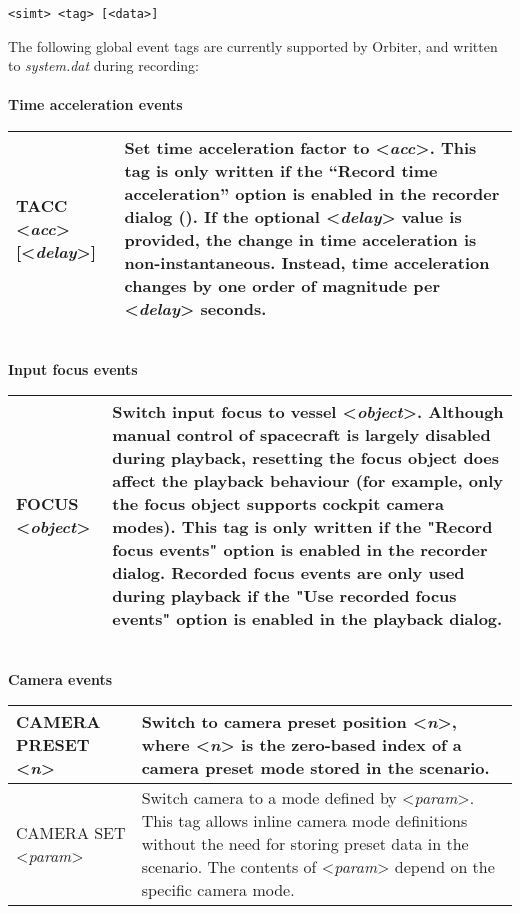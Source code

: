 \documentclass[Orbiter Technical Reference.tex]{subfiles}
\begin{document}
\begin{lstlisting}[language=OSFS]
<simt> <tag> [<data>]
\end{lstlisting}

\noindent
The following global event tags are currently supported by Orbiter, and written to \textit{system.dat} during recording:\\
\\
\textbf{Time acceleration events}

\begin{table}[H]
	\centering
	\begin{tabularx}{\textwidth}{ |l|X| }
	\hline\rule{0pt}{2ex}
	TACC <\textit{acc}> [<\textit{delay}>] & Set time acceleration factor to <\textit{acc}>. This tag is only written if  the “Record time acceleration” option is enabled in the recorder dialog (\Ctrl\keystroke{F5}). If the optional <\textit{delay}> value is provided, the change in time acceleration is non-instantaneous. Instead, time acceleration changes by one order of magnitude per <\textit{delay}> seconds.\\
	\hline
	\end{tabularx}
\end{table}

\noindent
\\
\textbf{Input focus events}

\begin{table}[H]
	\centering
	\begin{tabularx}{\textwidth}{ |l|X| }
	\hline\rule{0pt}{2ex}
	FOCUS <\textit{object}> & Switch input focus to vessel <\textit{object}>. Although manual control of spacecraft is largely disabled during playback, resetting the focus object does affect the playback behaviour (for example, only the focus object supports cockpit camera modes).\newline
	This tag is only written if the "Record focus events" option is enabled in the recorder dialog.\newline
	Recorded focus events are only used during playback if the "Use recorded focus events" option is enabled in the playback dialog.\\
	\hline
	\end{tabularx}
\end{table}

\noindent
\\
\textbf{Camera events}

\begin{table}[H]
	\centering
	\begin{tabularx}{\textwidth}{ |l|X| }
	\hline\rule{0pt}{2ex}
	CAMERA PRESET <\textit{n}> & Switch to camera preset position <\textit{n}>, where <\textit{n}> is the zero-based index of a camera preset mode stored in the scenario.\\
	\hline\rule{0pt}{2ex}
	CAMERA SET <\textit{param}> & Switch camera to a mode defined by <\textit{param}>. This tag allows inline camera mode definitions without the need for storing preset data in the scenario. The contents of <\textit{param}> depend on the specific camera mode.\\
	\hline
	\end{tabularx}
\end{table}
\end{document}
